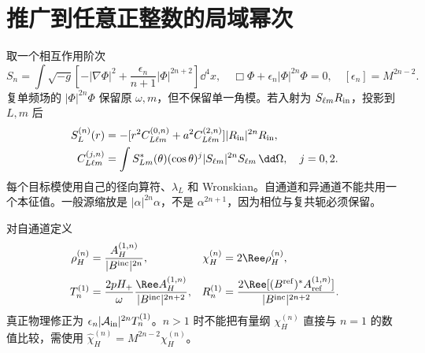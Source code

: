 \section{推广到任意正整数的局域幂次}
取一个相互作用阶次
\begin{equation}
 S_n=\int\sqrt{-g}\left[-|\nabla\Phi|^2+
 \frac{\epsilon_n}{n+1}|\Phi|^{2n+2}\right]\dd^4x,\quad
 \Box\Phi+\epsilon_n|\Phi|^{2n}\Phi=0,
 \quad [\epsilon_n]=M^{2n-2}.
\end{equation}
复单频场的 $|\Phi|^{2n}\Phi$ 保留原 $\omega,m$，但不保留单一角模。若入射为 $S_{\ell m}R_{\rm in}$，投影到 $L,m$ 后
\begin{align}
 S_{L}^{(n)}(r)&=-[r^2C_{L\ell m}^{(0,n)}+a^2C_{L\ell m}^{(2,n)}]
 |R_{\rm in}|^{2n}R_{\rm in},\\
 C_{L\ell m}^{(j,n)}&=\int S_{Lm}^*(\theta)
 (\cos\theta)^j|S_{\ell m}|^{2n}S_{\ell m}\,\dd\Omega,\quad j=0,2.
\end{align}
每个目标模使用自己的径向算符、$\lambda_L$ 和 Wronskian。自通道和异通道不能共用一个本征值。一般源缩放是 $|\alpha|^{2n}\alpha$，不是 $\alpha^{2n+1}$，因为相位与复共轭必须保留。

对自通道定义
\begin{align}
 \rho_H^{(n)}&=\frac{A_H^{(1,n)}}{|B^{\rm inc}|^{2n}},&
 \chi_H^{(n)}&=2\Ree\rho_H^{(n)},\\
 T_n^{(1)}&=\frac{2pH_+}{\omega}
 \frac{\Ree A_H^{(1,n)}}{|B^{\rm inc}|^{2n+2}},&
 R_n^{(1)}&=\frac{2\Ree[(B^{\rm ref})^*A_{\rm ref}^{(1,n)}]}
 {|B^{\rm inc}|^{2n+2}}.
\end{align}
真正物理修正为 $\epsilon_n|\mathcal A_{\rm in}|^{2n}T_n^{(1)}$。$n>1$ 时不能把有量纲 $\chi_H^{(n)}$ 直接与 $n=1$ 的数值比较，需使用 $\widehat\chi_H^{(n)}=M^{2n-2}\chi_H^{(n)}$。

